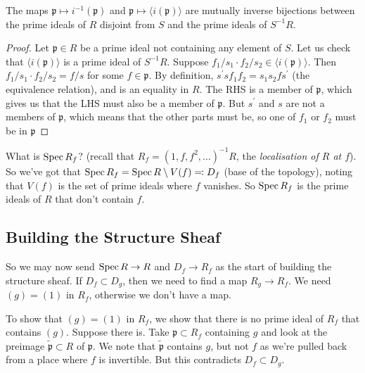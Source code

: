         \begin{proposition}
          The maps \(\mathfrak p \mapsto i^{-1}(\mathfrak p)\) and \(\mathfrak p \mapsto \langle i(\mathfrak p)\rangle\) are mutually inverse bijections between the prime ideals of \(R\) disjoint from \(S\) and the prime ideals of \(S^{-1}R\).
        \end{proposition}
        \begin{proof}
          Let $\mathfrak{p}\in R$ be a prime ideal not containing any element of \(S\).
          Let us check that \(\langle i(\mathfrak p)\rangle\) is a prime ideal of \(S^{-1}R\).
          Suppose \(f_1/s_1 \cdot f_2/s_2 \in \langle i(\mathfrak p)\rangle\).
          Then \(f_1/s_1 \cdot f_2/s_2  = f/s\) for some \(f \in \mathfrak p\).
           By definition, $s^\prime sf_1f_2=s_1s_2fs^\prime$ (the equivalence relation), and is an equality in $R$.
            The RHS is a member of $\mathfrak{p}$, which gives us that the LHS must also be a member of $\mathfrak{p}$.
            But $s^\prime$ and \(s\) are not a members of $\mathfrak p$, which means that the other parts must be, so one of $f_1$ or $f_2$ must be in $\mathfrak{p}$
        \end{proof}

        What is $\operatorname{Spec}{R_f}$? (recall that $R_f=(1,f,f^2,\dots)^{-1}R$, the \emph{localisation of $R$ at $f$}).
        So we've got that $\operatorname{Spec}{R_f}=\operatorname{Spec}{R}\setminus{V(f)}\eqqcolon D_f$ (base of the topology), noting that $V(f)$ is the set of prime ideals where $f$ vanishes.
        So $\operatorname{Spec}{R_f}$ is the prime ideals of $R$ that don't contain $f$.

    \subsection{Building the Structure Sheaf}
        So we may now send $\operatorname{Spec}{R}\to R$ and $D_f\to R_f$ as the start of building the structure sheaf.
        If $D_f\subset D_g$, then we need to find a map $R_g\to R_f$.
        We need $(g)=(1)$ in $R_f$, otherwise we don't have a map.

        To show that \((g) = (1)\) in \(R_{f}\), we show that there is no prime ideal of \(R_f\) that contains \((g)\).
        Suppose there is.
        Take $\mathfrak{p}\subset R_f$ containing $g$ and look at the preimage $\tilde{\mathfrak{p}}\subset R$ of $\mathfrak{p}$.
        We note that $\tilde{\mathfrak{p}}$ contains $g$, but not $f$ as we're pulled back from a place where $f$ is invertible.  But this contradicts \(D_f \subset D_g\).

